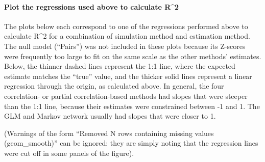\documentclass[11pt,]{article}
\let\oldparagraph\paragraph
\renewcommand{\paragraph}[1]{\oldparagraph{#1}\mbox{}}
\begin{document}
\paragraph{Plot the regressions used above to calculate
R\^{}2}\label{plot-the-regressions-used-above-to-calculate-r2}

The plots below each correspond to one of the regressions performed
above to calculate R\^{}2 for a combination of simulation method and
estimation method. The null model (``Pairs'') was not included in these
plots because its Z-scores were frequently too large to fit on the same
scale as the other methods' estimates. Below, the thinner dashed lines
represent the 1:1 line, where the expected estimate matches the ``true''
value, and the thicker solid lines represent a linear regression through
the origin, as calculated above. In general, the four correlation- or
partial correlation-based methods had slopes that were steeper than the
1:1 line, because their estimates were constrained between -1 and 1. The
GLM and Markov network usually had slopes that were closer to 1.

(Warnings of the form ``Removed N rows containing missing values
(geom\_smooth)'' can be ignored: they are simply noting that the
regression lines were cut off in some panels of the figure).
\end{document}

